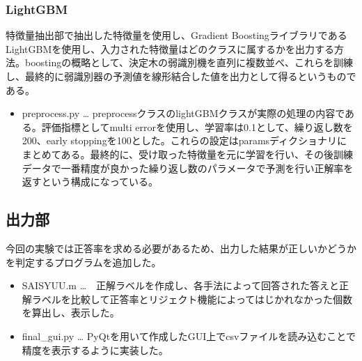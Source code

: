 \documentclass[10.5pt,a4j]{jarticle}
\begin{document}
	\subsubsection{LightGBM}
	特徴量抽出部で抽出した特徴量を使用し、Gradient BoostingライブラリであるLightGBMを使用し、入力された特徴量はどのクラスに属するかを出力する方法。boostingの概略として、決定木の弱識別機を直列に複数並べ、これらを訓練し、最終的に弱識別器の予測値を線形結合した値を出力として得るというものである。

	\begin{itemize}
		\item preprocess.py … preprocessクラスのlightGBMクラスが実際の処理の内容である。評価指標としてmulti errorを使用し、学習率は0.1として、繰り返し数を200、early stoppingを100とした。これらの設定はparamsディクショナリにまとめてある。最終的に、受け取った特徴量を元に学習を行い、その後訓練データで一番精度が良かった繰り返し数のパラメータで予測を行い正解率を返すという構成になっている。
	\end{itemize}

	\subsection{出力部}
	今回の実験では正答率を求める必要があるため、出力した結果が正しいかどうかを判定するプログラムを追加した。
	\begin{itemize}
		\item SAISYUU.m …　正解ラベルを作成し、各手法によって回答された答えと正解ラベルを比較して正答率とリジェクト機能によってはじかれなかった個数を算出し、表示した。
		\item final\_gui.py … PyQtを用いて作成したGUI上でcsvファイルを読み込むことで精度を表示するように実装した。
	\end{itemize}
	\newpage
\end{document}

